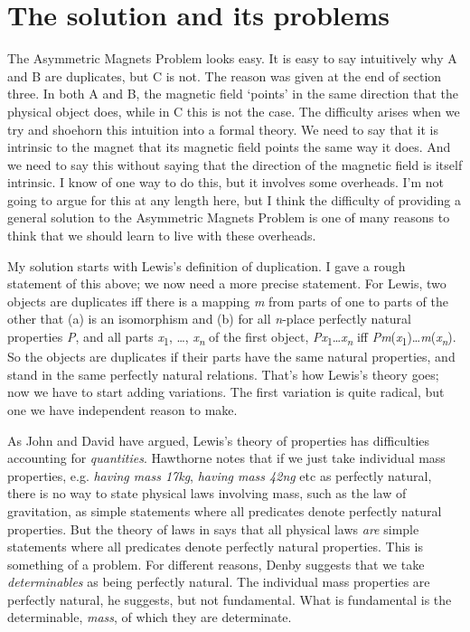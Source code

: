 \section{The solution and its problems}

The Asymmetric Magnets Problem looks easy. It is easy to say intuitively why A and B are duplicates, but C is not. The reason was given at the end of section three. In both A and B, the magnetic field `points' in the same direction that the physical object does, while in C this is not the case. The difficulty arises when we try and shoehorn this intuition into a formal theory. We need to say that it is intrinsic to the magnet that its magnetic field points the same way it does. And we need to say this without saying that the direction of the magnetic field is itself intrinsic. I know of one way to do this, but it involves some overheads. I'm not going to argue for this at any length here, but I think the difficulty of providing a general solution to the Asymmetric Magnets Problem is one of many reasons to think that we should learn to live with these overheads.

My solution starts with Lewis's definition of duplication. I gave a rough statement of this above; we now need a more precise statement. For Lewis, two objects are duplicates iff there is a mapping \textit{m} from parts of one to parts of the other that (a) is an isomorphism and (b) for all \textit{n}-place perfectly natural properties \textit{P}, and all parts \textit{x}\textsubscript{1}, {\dots}, \textit{x}\textit{\textsubscript{n}} of the first object, \textit{Px}\textsubscript{1}{\dots}\textit{x}\textit{\textsubscript{n}} iff \textit{Pm}(\textit{x}\textsubscript{1}){\dots}\textit{m}(\textit{x}\textit{\textsubscript{n}}). So the objects are duplicates if their parts have the same natural properties, and stand in the same perfectly natural relations. That's how Lewis's theory goes; now we have to start adding variations. The first variation is quite radical, but one we have independent reason to make.

As John \citet{Hawthorne2006} and David \citet{Denby2001} have argued, Lewis's theory of properties has difficulties accounting for \textit{quantities}. Hawthorne notes that if we just take individual mass properties, e.g. \textit{having mass 17kg}, \textit{having mass 42ng} etc as perfectly natural, there is no way to state physical laws involving mass, such as the law of gravitation, as simple statements where all predicates denote perfectly natural properties. But the theory of laws in \citet{Lewis1983e} says that all physical laws \textit{are} simple statements where all predicates denote perfectly natural properties. This is something of a problem. For different reasons, Denby suggests that we take \textit{determinables} as being perfectly natural. The individual mass properties are perfectly natural, he suggests, but not fundamental. What is fundamental is the determinable, \textit{mass}, of which they are determinate.

